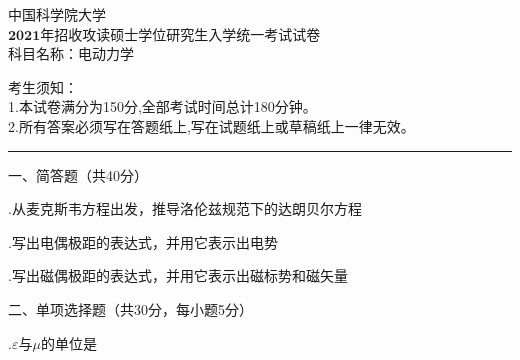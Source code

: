 \begin{center}
	\heiti
	\LARGE{ 中国科学院大学\\ $\boldsymbol{2021}$年招收攻读硕士学位研究生入学统一考试试卷\\
	科目名称：电动力学}

\end{center}
\noindent
考生须知：\\
1.本试卷满分为150分,全部考试时间总计180分钟。\\
2.所有答案必须写在答题纸上,写在试题纸上或草稿纸上一律无效。

\vspace*{2ex}
\hrule
\vspace*{4ex}


\setcounter{page}{1}%
\pagestyle{mypagestyle}

\onehalfspacing

\vspace{0.4cm}

\noindent
一、简答题（共40分）
\vspace{0.2cm}

.\hspace{0.8em}从麦克斯韦方程出发，推导洛伦兹规范下的达朗贝尔方程
\vspace{0.1cm}

.\hspace{0.8em}写出电偶极距的表达式，并用它表示出电势
\vspace{0.1cm}

.\hspace{0.8em}写出磁偶极距的表达式，并用它表示出磁标势和磁矢量
\vspace{0.4cm}

\noindent
二、\hspace{0.2em}单项选择题（共30分，每小题5分）
\vspace{0.2cm}

.\hspace{0.8em}$\varepsilon$与$\mu$的单位是
\vspace{0.2cm}

